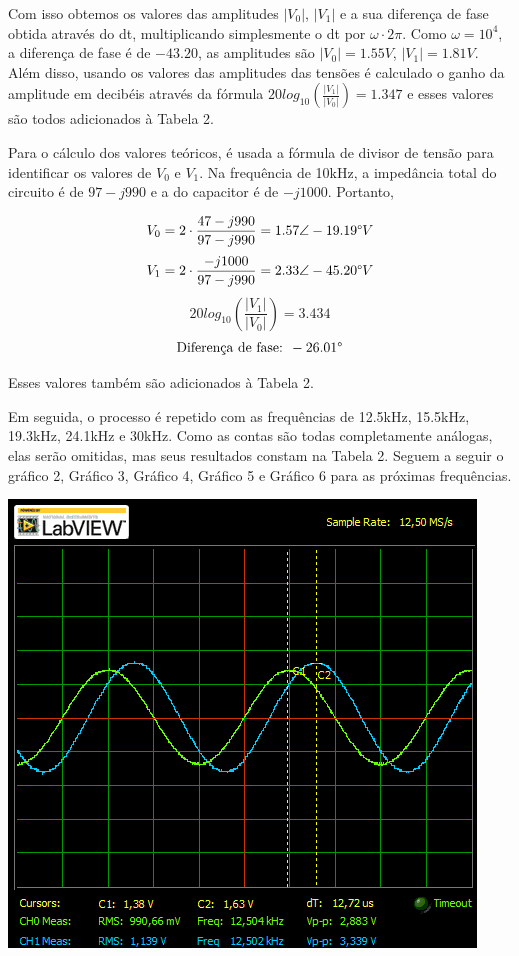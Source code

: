 \documentclass[a4 paper]{article}
\begin{document}
Com isso obtemos os valores das amplitudes $|V_0|$, $|V_1|$ e a sua diferença de fase obtida através do dt, multiplicando simplesmente o dt por $\omega\cdot2\pi$. Como $\omega = 10^4$, a diferença de fase é de $-43.20$\textdegree, as amplitudes são $|V_0|=1.55V$, $|V_1|=1.81V$. Além disso, usando os valores das amplitudes das tensões é calculado o ganho da amplitude em decibéis através da fórmula $20log_{10}\left(\frac{|V_1|}{|V_0|}\right) = 1.347$ e esses valores são todos adicionados à Tabela 2.

Para o cálculo dos valores teóricos, é usada a fórmula de divisor de tensão para identificar os valores de $V_0$ e $V_1$. Na frequência de 10kHz, a impedância total do circuito é de $97-j990$ e a do capacitor é de $-j1000$. Portanto,

\[V_0 = 2\cdot\frac{47-j990}{97-j990}=1.57\angle-19.19\text{\textdegree}V\]
\[V_1=2\cdot\frac{-j1000}{97-j990}=2.33\angle-45.20\text{\textdegree}V\]
\[20log_{10}\left(\frac{|V_1|}{|V_0|}\right)=3.434\]
\[\text{Diferença de fase: }-26.01\text{\textdegree}\]

Esses valores também são adicionados à Tabela 2.

Em seguida, o processo é repetido com as frequências de 12.5kHz, 15.5kHz, 19.3kHz, 24.1kHz e 30kHz. Como as contas são todas completamente análogas, elas serão omitidas, mas seus resultados constam na Tabela 2. Seguem a seguir o gráfico 2, Gráfico 3, Gráfico 4, Gráfico 5 e Gráfico 6 para as próximas frequências.


\begin{table}[h]
\centering
\includegraphics[scale=0.7]{graficos/circ1/rgadicoa1-2-12_5}
\end{table}
\end{document}

